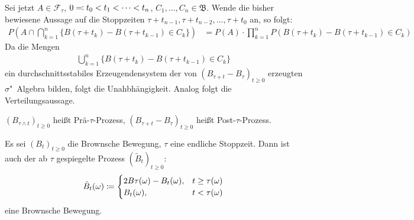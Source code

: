 \documentclass[a4paper,twoside,DIV15,BCOR12mm]{scrbook}
\newcommand{\cF}{\mathcal F}
\newcommand{\borel}{{\mathfrak B}}
\begin{document}
\begin{beweis}
Sei jetzt $A\in \cF_\tau$, $0\ad t_0 < t_1 <\cdots < t_n$, $C_1,\ldots,C_n\in \borel$. Wende die bisher bewiesene Aussage auf die Stoppzeiten $\tau + t_{n-1},\tau + t_{n-2},\ldots,\tau+t_0$ an, so folgt:
\begin{align*}
P(A\cap \bigcap_{k=1}^n \{B(\tau + t_k) - B(\tau +t_{k-1}) \in C_k\}) 
&=  P(A) \cdot \prod_{k=1}^nP(B(\tau+t_k) - B(\tau + t_{k-1}) \in C_k)
\end{align*}
Da die Mengen 
\begin{align*}
\bigcup_{k=1}^n \{B(\tau +t_k) - B(\tau +t_{k-1}) \in C_k\}
\end{align*}
ein durchschnittsstabiles Erzeugendensystem der von $(B_{\tau +t}-B_\tau)_{t\ge 0}$ erzeugten $\sigma$"~Algebra bilden, folgt die Unahbhängigkeit. Analog folgt die Verteilungsaussage.
\end{beweis}

\begin{bemerkung}
$(B_{\tau \wedge t})_{t\ge 0}$ heißt Prä-$\tau$-Prozess, $(B_{\tau+t}-B_\tau)_{t\ge 0}$ heißt Post-$\tau$-Prozess.
\end{bemerkung}

\begin{satz}
\label{satz:13.3}
Es sei $(B_t)_{t\ge 0}$ die Brownsche Bewegung, $\tau$ eine endliche Stoppzeit. Dann ist auch der ab $\tau$ gespiegelte Prozess $(\tilde B_t)_{t\ge 0}$:
\begin{align*}
\tilde B_t(\omega) \da 
\begin{cases}
2B{\tau (\omega)}-B_t(\omega),& t\ge \tau(\omega) \\
B_t(\omega), & t< \tau(\omega)
\end{cases}
\end{align*}
eine Brownsche Bewegung.
\end{satz}

%
% 
% 
% 
\end{document}
